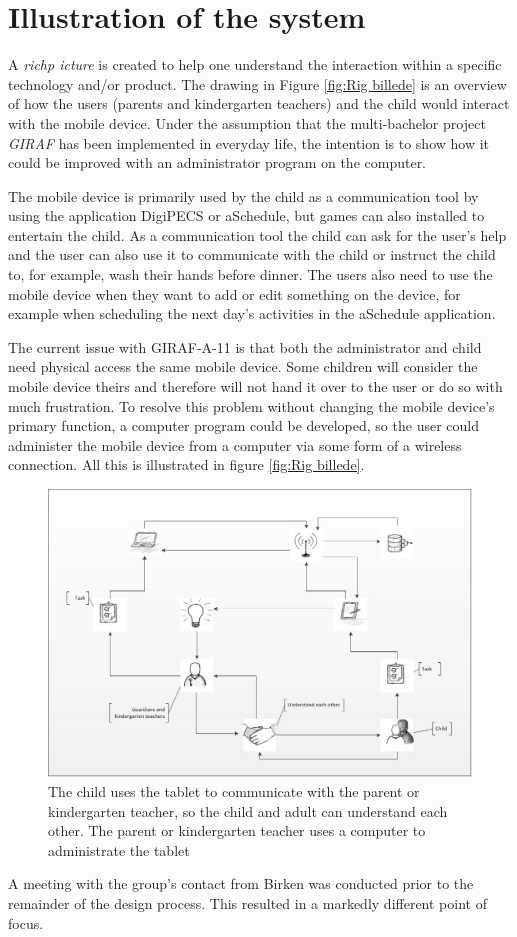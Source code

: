 \section{Illustration of the system}
A \emph{richp icture} is created to help one understand the interaction within a specific technology and/or product\cite{OOAD}. The drawing in Figure \vref{fig:Rig billede} is an overview of how the users (parents and kindergarten teachers) and the child would interact with the mobile device. Under the assumption that the multi-bachelor project \emph{GIRAF} has been implemented in everyday life, the intention is to show how it could be improved with an administrator program on the computer.

The mobile device is primarily used by the child as a communication tool by using the application DigiPECS or aSchedule, but games can also installed to entertain the child. As a communication tool the child can ask for the user's help and the user can also use it to communicate with the child or instruct the child to, for example, wash their hands before dinner.
The users also need to use the mobile device when they want to add or edit something on the device, for example when scheduling the next day's activities in the aSchedule application.
 
The current issue with GIRAF-A-11 is that both the administrator and child need physical access the same mobile device. Some children will consider the mobile device theirs and therefore will not hand it over to the user or do so with much frustration. To resolve this problem without changing the mobile device's primary function, a computer program could be developed, so the user could administer the mobile device from a computer via some form of a wireless connection. All this is illustrated in figure \vref{fig:Rig billede}. 

\begin{figure}[!ht]
	\centering
		\includegraphics[width=1.00\textwidth]{img/Rig_billede2.jpg}
	\caption{The child uses the tablet to communicate with the parent or kindergarten teacher, so the child and adult can understand each other. The parent or kindergarten teacher uses a computer to administrate the tablet}
	\label{fig:Rig billede}
\end{figure}
\newpage

A meeting with the group's contact from Birken was conducted prior to the remainder of the design process. This resulted in a markedly different point of focus.
    